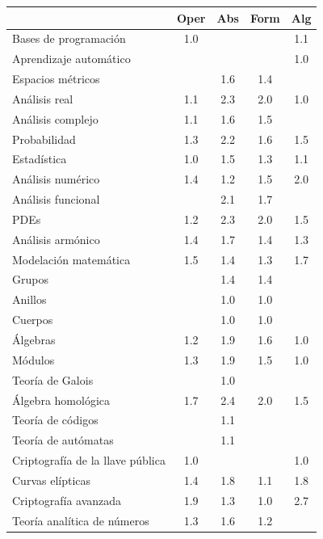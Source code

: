 \begin{refsection}
\begin{table}[H]
\begin{center}
\end{center}
\begin{center}
\begin{tabular}{|l|c|c|c|c|}
\hline
\rowcolor[HTML]{00C0F3} 
\multicolumn{1}{|c|}{\cellcolor[HTML]{00C0F3} \textbf{Contenidos}} & \textbf{Oper} & \textbf{Abs} & \textbf{Form} & \textbf{Alg} \\ \hline
Bases de programación & 1.0 &  &  & 1.1 \\ \hline
Aprendizaje automático &  &  &  & 1.0 \\ \hline
Espacios métricos &  & 1.6 & 1.4 &  \\ \hline
Análisis real & 1.1 & 2.3 & 2.0 & 1.0 \\ \hline
Análisis complejo & 1.1 & 1.6 & 1.5 &  \\ \hline
Probabilidad & 1.3 & 2.2 & 1.6 & 1.5 \\ \hline
Estadística & 1.0 & 1.5 & 1.3 & 1.1 \\ \hline
Análisis numérico & 1.4 & 1.2 & 1.5 & 2.0 \\ \hline
Análisis funcional &  & 2.1 & 1.7 &  \\ \hline
PDEs & 1.2 & 2.3 & 2.0 & 1.5 \\ \hline
Análisis armónico & 1.4 & 1.7 & 1.4 & 1.3 \\ \hline
Modelación matemática & 1.5 & 1.4 & 1.3 & 1.7 \\ \hline
Grupos &  & 1.4 & 1.4 &  \\ \hline
Anillos &  & 1.0 & 1.0 &  \\ \hline
Cuerpos &  & 1.0 & 1.0 &  \\ \hline
Álgebras & 1.2 & 1.9 & 1.6 & 1.0 \\ \hline
Módulos & 1.3 & 1.9 & 1.5 & 1.0 \\ \hline
Teoría de Galois &  & 1.0 &  &  \\ \hline
Álgebra homológica & 1.7 & 2.4 & 2.0 & 1.5 \\ \hline
Teoría de códigos &  & 1.1 &  &  \\ \hline
Teoría de autómatas &  & 1.1 &  &  \\ \hline
Criptografía de la llave pública & 1.0 &  &  & 1.0 \\ \hline
Curvas elípticas & 1.4 & 1.8 & 1.1 & 1.8 \\ \hline
Criptografía avanzada & 1.9 & 1.3 & 1.0 & 2.7 \\ \hline
Teoría analítica de números & 1.3 & 1.6 & 1.2 &  \\ \hline

\end{tabular}
\end{center}
\end{table}
\end{refsection}

